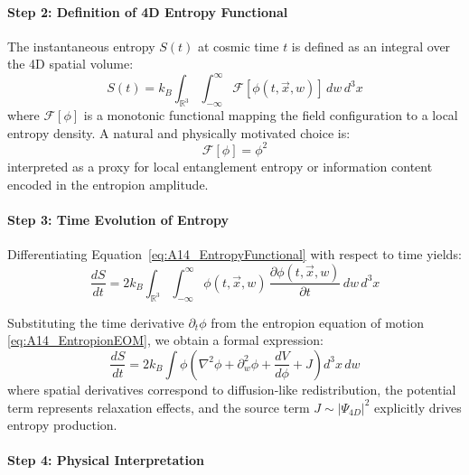 \documentclass[12pt]{article}
\begin{document}
\paragraph{Step 2: Definition of 4D Entropy Functional}

The instantaneous entropy \(S(t)\) at cosmic time \(t\) is defined as an integral over the 4D spatial volume:
\begin{equation}
S(t) = k_B \int_{\mathbb{R}^3} \int_{-\infty}^\infty \mathcal{F}[\phi(t, \vec{x}, w)]\, dw\, d^3x
\label{eq:A14_EntropyFunctional}
\end{equation}
where \(\mathcal{F}[\phi]\) is a monotonic functional mapping the field configuration to a local entropy density. A natural and physically motivated choice is:
\begin{equation}
\mathcal{F}[\phi] = \phi^2
\label{eq:A14_EntropyDensity}
\end{equation}
interpreted as a proxy for local entanglement entropy or information content encoded in the entropion amplitude.

\paragraph{Step 3: Time Evolution of Entropy}

Differentiating Equation~\eqref{eq:A14_EntropyFunctional} with respect to time yields:
\begin{equation}
\frac{dS}{dt} = 2 k_B \int_{\mathbb{R}^3} \int_{-\infty}^\infty \phi(t, \vec{x}, w)\, \frac{\partial \phi(t, \vec{x}, w)}{\partial t} \, dw\, d^3x
\label{eq:A14_EntropyTimeDerivative}
\end{equation}

Substituting the time derivative \(\partial_t \phi\) from the entropion equation of motion \eqref{eq:A14_EntropionEOM}, we obtain a formal expression:
\begin{equation}
\frac{dS}{dt} = 2 k_B \int \phi \left( \nabla^2 \phi + \partial_w^2 \phi + \frac{dV}{d\phi} + J \right) d^3x\, dw
\label{eq:A14_EntropyFullEvolution}
\end{equation}
where spatial derivatives correspond to diffusion-like redistribution, the potential term represents relaxation effects, and the source term \(J \sim |\Psi_{4D}|^2\) explicitly drives entropy production.

\paragraph{Step 4: Physical Interpretation}
\end{document}
